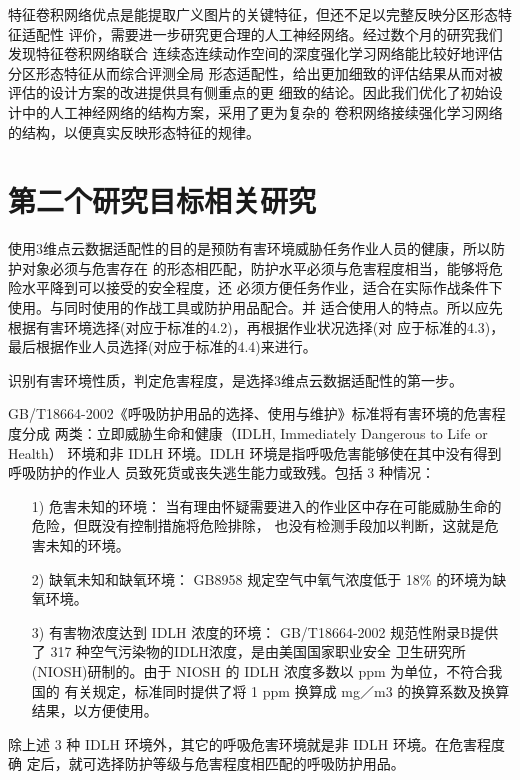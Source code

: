 \documentclass[a4paper,12pt]{ctexbook}	%
\begin{document}
特征卷积网络优点是能提取广义图片的关键特征，但还不足以完整反映分区形态特征适配性
评价，需要进一步研究更合理的人工神经网络。经过数个月的研究我们发现特征卷积网络联合
连续态连续动作空间的深度强化学习网络能比较好地评估分区形态特征从而综合评测全局
形态适配性，给出更加细致的评估结果从而对被评估的设计方案的改进提供具有侧重点的更
细致的结论。因此我们优化了初始设计中的人工神经网络的结构方案，采用了更为复杂的
卷积网络接续强化学习网络的结构，以便真实反映形态特征的规律。

\section{第二个研究目标相关研究}

使用3维点云数据适配性的目的是预防有害环境威胁任务作业人员的健康，所以防护对象必须与危害存在
的形态相匹配，防护水平必须与危害程度相当，能够将危险水平降到可以接受的安全程度，还
必须方便任务作业，适合在实际作战条件下使用。与同时使用的作战工具或防护用品配合。并
适合使用人的特点。所以应先根据有害环境选择(对应于标准的4.2)，再根据作业状况选择(对
应于标准的4.3)，最后根据作业人员选择(对应于标准的4.4)来进行。

识别有害环境性质，判定危害程度，是选择3维点云数据适配性的第一步。


GB/T18664-2002《呼吸防护用品的选择、使用与维护》标准将有害环境的危害程度分成
两类：立即威胁生命和健康（IDLH, Immediately Dangerous to Life or Health）
环境和非 IDLH 环境。IDLH 环境是指呼吸危害能够使在其中没有得到呼吸防护的作业人
员致死货或丧失逃生能力或致残。包括 3 种情况：

\begin{itemize}
\setlength{\parskip}{0pt}
\item[1)]
{\heiti
危害未知的环境：
}
当有理由怀疑需要进入的作业区中存在可能威胁生命的危险，但既没有控制措施将危险排除，
也没有检测手段加以判断，这就是危害未知的环境。

\item[2)]
{\heiti
缺氧未知和缺氧环境：
}
GB8958 规定空气中氧气浓度低于 18\% 的环境为缺氧环境。
\item[3)]
{\heiti
有害物浓度达到 IDLH 浓度的环境：
}
GB/T18664-2002 规范性附录B提供了 317 种空气污染物的IDLH浓度，是由美国国家职业安全
卫生研究所(NIOSH)研制的。由于 NIOSH 的 IDLH 浓度多数以 ppm 为单位，不符合我国的
有关规定，标准同时提供了将 1 ppm 换算成 mg／m3 的换算系数及换算结果，以方便使用。

\end{itemize}

除上述 3 种 IDLH 环境外，其它的呼吸危害环境就是非 IDLH 环境。在危害程度确
定后，就可选择防护等级与危害程度相匹配的呼吸防护用品。
\end{document}
